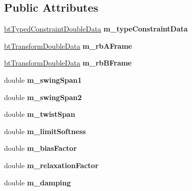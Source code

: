 \subsection*{Public Attributes}
\begin{DoxyCompactItemize}
\item 
\mbox{\label{structbtConeTwistConstraintDoubleData_a2c025cafc78fb0957b574c553beb7107}} 
\hyperlink{structbtTypedConstraintDoubleData}{bt\+Typed\+Constraint\+Double\+Data} {\bfseries m\+\_\+type\+Constraint\+Data}
\item 
\mbox{\label{structbtConeTwistConstraintDoubleData_af26ee70fc95b5c1fa6915b87f207db70}} 
\hyperlink{structbtTransformDoubleData}{bt\+Transform\+Double\+Data} {\bfseries m\+\_\+rb\+A\+Frame}
\item 
\mbox{\label{structbtConeTwistConstraintDoubleData_ab6118fb912908c31d7049f2ff32eed24}} 
\hyperlink{structbtTransformDoubleData}{bt\+Transform\+Double\+Data} {\bfseries m\+\_\+rb\+B\+Frame}
\item 
\mbox{\label{structbtConeTwistConstraintDoubleData_ae3409769b377340aee5f1ce2ee4400f0}} 
double {\bfseries m\+\_\+swing\+Span1}
\item 
\mbox{\label{structbtConeTwistConstraintDoubleData_aab156c2780767d200f39fd13dddef94b}} 
double {\bfseries m\+\_\+swing\+Span2}
\item 
\mbox{\label{structbtConeTwistConstraintDoubleData_ac388d94e593b005798fd982f0b1ed553}} 
double {\bfseries m\+\_\+twist\+Span}
\item 
\mbox{\label{structbtConeTwistConstraintDoubleData_aac503a53cbc51bdc811d00b069204ce7}} 
double {\bfseries m\+\_\+limit\+Softness}
\item 
\mbox{\label{structbtConeTwistConstraintDoubleData_a652d206046bfacc0f093b4551b9f2ff3}} 
double {\bfseries m\+\_\+bias\+Factor}
\item 
\mbox{\label{structbtConeTwistConstraintDoubleData_ad3a740156d2dff51a10564c5aa7d44a6}} 
double {\bfseries m\+\_\+relaxation\+Factor}
\item 
\mbox{\label{structbtConeTwistConstraintDoubleData_a602d893f0fb62617989895db260a2b8c}} 
double {\bfseries m\+\_\+damping}
\end{DoxyCompactItemize}


